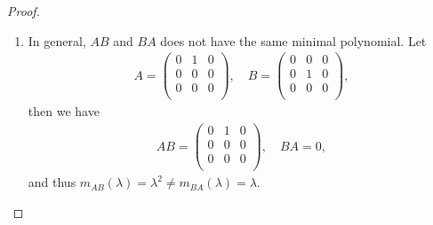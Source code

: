 \documentclass[11pt]{article}
\theoremstyle{definition}
\numberwithin{equation}{subsection}
\begin{document}
\begin{proof}
\begin{enumerate}[label=(\alph*)]
    \item In general, $AB$ and $BA$ does not have the same minimal polynomial. Let
    \begin{align*}
        A = \begin{pmatrix}
            0 & 1 & 0 \\
            0 & 0 & 0 \\
            0 & 0 & 0 \\
        \end{pmatrix}, \quad B = \begin{pmatrix}
            0 & 0 & 0 \\
            0 & 1 & 0 \\
            0 & 0 & 0 \\
        \end{pmatrix},
    \end{align*}
    then we have 
    \begin{align*}
        AB = \begin{pmatrix}
            0 & 1 & 0 \\
            0 & 0 & 0 \\
            0 & 0 & 0 \\
        \end{pmatrix}, \quad BA = 0,
    \end{align*}
    and thus $m_{AB}(\lambda) = \lambda^2 \neq m_{BA}(\lambda) = \lambda$.
\end{enumerate}
\end{proof}

\medskip
\end{document}
